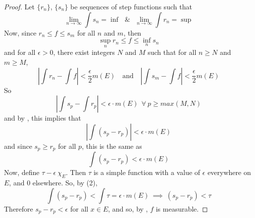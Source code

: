 \begin{pblm}
\begin{proof}
	Let $\{r_n\}$, $\{s_n\}$ be sequences of step functions such that 
	\begin{equation*}
		\lim\limits_{n\to\infty} \int s_n = \inf ~~~ \& ~~~ 
		\lim\limits_{n\to\infty} \int r_n = \sup 
	\end{equation*}
	Now, since $r_n \le f \le s_m$ for all $n$ and $m$, then 
	\begin{equation*}
		\sup\limits_{n}r_n \le f \le \inf\limits_{n}s_n
	\end{equation*}
	and for all $\epsilon > 0$, there exist integers $N$ and $M$ such that for all 
	$n \ge N$ and $m \ge M$, 
	\begin{equation*}
		\left|\int r_n - \int f\right| < \frac{\epsilon}{2}m(E) ~~~ \text{ and } ~~~ 
		\left|\int s_m - \int f\right| < \frac{\epsilon}{2}m(E)
	\end{equation*}
	So 
	\begin{equation*}
		\left|\int s_p - \int r_p\right| < \epsilon \cdot m(E) ~~\forall~ p \ge max(M,N)
	\end{equation*}
	and by , this implies that 
	\begin{equation*}
		\left|\int (s_p - r_p)\right| < \epsilon \cdot m(E)
	\end{equation*}
	and since $s_p \ge r_p$ for all $p$, this is the same as 
	\begin{equation*}
		\int (s_p - r_p) < \epsilon \cdot m(E)
	\end{equation*}
	Now, define $\tau - \epsilon ~\chi_E$. Then $\tau$ is a simple function with a 
	value of $\epsilon$ everywhere on $E$, and $0$ elsewhere. So, by 
	 (2), 
	\begin{equation*}
		\int (s_p - r_p) < \int \tau =  \epsilon \cdot m(E) ~ \implies ~ (s_p - r_p) < \tau 
	\end{equation*}
	Therefore $s_p - r_p < \epsilon$ for all $x \in E$, and so, by , $f$ is measurable. 


\end{proof}
\end{pblm}
